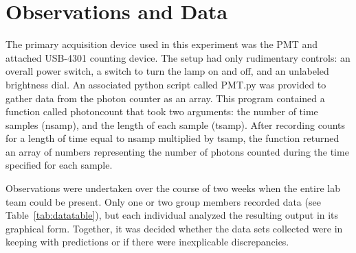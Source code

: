 \documentclass[a4paper,12pt]{article}
\begin{document}
\section{Observations and Data}
\label{sec:observations}

The primary acquisition device used in this experiment was the PMT and attached USB-4301 counting device. The setup had only rudimentary controls: an overall power switch, a switch to turn the lamp on and off, and an unlabeled brightness dial.  An associated python script called PMT.py was provided to gather data from the photon counter as an array. This program contained a function called photoncount that took two arguments: the number of time samples (nsamp), and the length of each sample (tsamp). After recording counts for a length of time equal to nsamp multiplied by tsamp, the function returned an array of numbers representing the number of photons counted during the time specified for each sample.

Observations were undertaken over the course of two weeks when the entire lab team could be present. Only one or two group members recorded data (see Table~\ref{tab:datatable}), but each individual analyzed the resulting output in its graphical form. Together, it was decided whether the data sets collected were in keeping with predictions or if there were inexplicable discrepancies.
\end{document}
